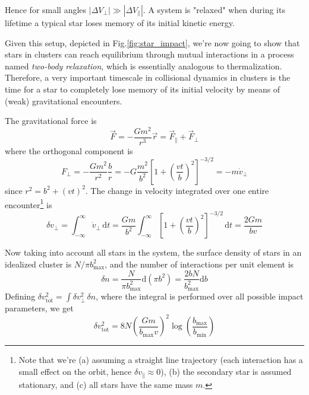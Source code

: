 Hence for small angles $|\Delta V_{\perp}| \gg |\Delta V_{\parallel}|$. A system is "relaxed" when during its lifetime a typical star loses memory of its initial kinetic energy.

\par Given this setup, depicted in Fig.\ref{fig:star_impact}, we're now going to show that stars in clusters can reach equilibrium through mutual interactions in a process named \emph{two-body relaxation}, which is essentially analogous to thermalization. Therefore, a very important timescale in collisional dynamics in clusters is the time for a star to completely lose memory of its initial velocity by means of (weak) gravitational encounters.
\par The gravitational force is 
\begin{equation*}
    \vec{F} = -\frac{Gm^{2}}{r^{3}}\vec{r} = \vec{F}_{\parallel}+\vec{F}_{\perp}
\end{equation*}
where the orthogonal component is
\begin{equation*}
    F_{\perp} = -\frac{Gm^{2}}{r^{2}}\frac{b}{r} = -G\frac{m^{2}}{b^{2}}\left[1+\left(\frac{vt}{b}\right)^{2}\right]^{-3/2} = -m\dot{v}_{\perp}
\end{equation*}
since $r^{2} = b^{2}+(vt)^{2}$. The change in velocity integrated over one entire encounter\footnote{Note that we're (a) assuming a straight line trajectory (each interaction has a small effect on the orbit, hence $\delta v_{\parallel}\approx 0$), (b) the secondary star is assumed stationary, and (c) all stars have the same mass $m$.} is 
\begin{equation*}
    \delta v_{\perp} = \int_{-\infty}^{\infty}\dot{v}_{\perp}\,\text{d}t = \frac{Gm}{b^{2}}\int_{-\infty}^{\infty}\left[1+\left(\frac{vt}{b}\right)^{2}\right]^{-3/2}\,\text{d}t = \frac{2Gm}{bv}
\end{equation*}
\par Now taking into account all stars in the system, the surface density of stars in an idealized cluster is $N/\pi b_{\text{max}}^{2}$, and the number of interactions per unit element is 
\begin{equation*}
    \delta n = \frac{N}{\pi b_{\text{max}}^{2}}\text{d}(\pi b^{2}) = \frac{2bN}{b_{\text{max}}^{2}}\text{d}b
\end{equation*}
Defining $\delta v^{2}_{\text{tot}} = \int \delta v^{2}_{\perp}\,\delta n$, where the integral is performed over all possible impact parameters, we get
\begin{equation*}
    \delta v^{2}_{\text{tot}} = 8N\left(\frac{Gm}{b_{\text{max}}v}\right)^{2}\log\left(\frac{b_{\text{max}}}{b_{\text{min}}}\right)
\end{equation*}
